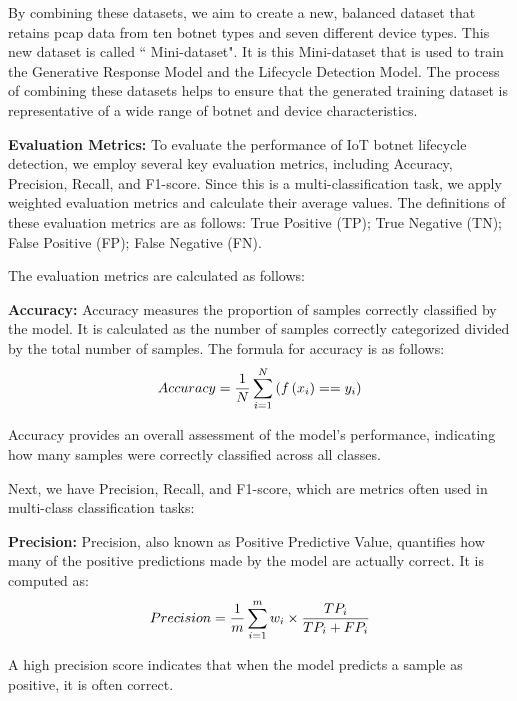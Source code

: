 \documentclass[journal]{IEEEtai}
\begin{document}
By combining these datasets, we aim to create a new, balanced dataset that retains pcap data from ten botnet types and seven different device types.
This new dataset is called “ Mini-dataset".
It is this Mini-dataset that is used to train the Generative Response Model and the Lifecycle Detection Model.
The process of combining these datasets helps to ensure that the generated training dataset is representative of a wide range of botnet and device characteristics.

\textbf{Evaluation Metrics:}
To evaluate the performance of IoT botnet lifecycle detection, we employ several key evaluation metrics, including Accuracy, Precision, Recall, and F1-score. 
Since this is a multi-classification task, we apply weighted evaluation metrics and calculate their average values. 
The definitions of these evaluation metrics are as follows:
True Positive (TP); True Negative (TN); False Positive (FP); False Negative (FN).

The evaluation metrics are calculated as follows:

\textbf{Accuracy:} Accuracy measures the proportion of samples correctly classified by the model. 
It is calculated as the number of samples correctly categorized divided by the total number of samples. 
The formula for accuracy is as follows:
\begin{align}
\small
	\begin{split}
		Accuracy=\frac{1}{N} \sum_{i=1}^{N}\left(f\left(x_{i}\right)==y_{i}\right) 
	\end{split}
	\label{Accuracy}
\end{align}

Accuracy provides an overall assessment of the model's performance, indicating how many samples were correctly classified across all classes.

Next, we have Precision, Recall, and F1-score, which are metrics often used in multi-class classification tasks:

\textbf{Precision:} Precision, also known as Positive Predictive Value, quantifies how many of the positive predictions made by the model are actually correct. It is computed as:
\begin{align}
\small
	\begin{split}
		Precision =\frac{1}{m} \sum_{i=1}^{m} w_{i} \times \frac{T P_{i}}{T P_{i}+F P_{i}} 
	\end{split}
	\label{WeightedP}
\end{align}

A high precision score indicates that when the model predicts a sample as positive, it is often correct.
\end{document}
